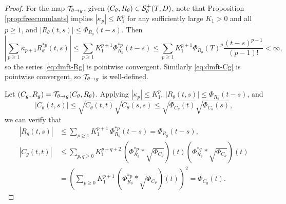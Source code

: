 \begin{proof}
For the map $\mathcal{T}_{\theta\to g}$, given $(C_\theta,R_\theta)\in
\mathcal{S}_\theta^+(T,D)$, note that Proposition \ref{prop:freecumulants}
implies $|\kappa_p| \leq K_1^p$ for any sufficiently large $K_1>0$ and all
$p \geq 1$, and $|R_\theta(t,s)| \leq \Phi_{R_\theta}(t-s)$. Then
\[\left|\sum_{p \geq 1} \kappa_{p+1} R_\theta^{*p}(t,s)\right|
\leq \sum_{p \geq 1} K_1^{p+1} \Phi_{R_\theta}^{*p}(t-s)
\leq \sum_{p \geq 1} K_1^{p+1}\Phi_{R_\theta}(T)^p
\frac{(t-s)^{p-1}}{(p-1)!}<\infty,\]
so the series \eqref{eq:dmft-Rg} is pointwise convergent. Similarly
\eqref{eq:dmft-Cg} is pointwise convergent, so
$\mathcal{T}_{\theta\to g}$ is well-defined.

Let $(C_g,R_g)=\mathcal{T}_{\theta\to g}(C_\theta,R_\theta)$. 
Applying $|\kappa_p| \leq K_1^p$, $|R_\theta(t,s)| \leq \Phi_{R_\theta}(t-s)$,
and
\[
|C_\theta(t,s)| \le \sqrt{C_\theta(t,t)}\sqrt{C_\theta(s,s)} \le \sqrt{\Phi_{C_\theta}(t)}\sqrt{\Phi_{C_\theta}(s)},
\]
we can verify that
\begin{align*}
    |R_g(t,s)| &\le \sum_{p \geq 1} K_1^{p+1}\,\Phi_{R_\theta}^{\ast p}(t-s) =
\Phi_{R_g}(t-s),\\
    |C_g(t,t)| &\le \sum_{p,q \geq 0} K_1^{p+q+2}\,
(\Phi_{R_\theta}^{\ast p} \ast \sqrt{\Phi_{C_\theta}})(t) (\Phi_{R_\theta}^{\ast
q} \ast \sqrt{\Phi_{C_\theta}})(t)\\
&=\left(\sum_{p\ge 0} K_1^{p+1}\,
(\Phi_{R_\theta}^{\ast p} \ast \sqrt{\Phi_{C_\theta}})(t)\right)^2 = \Phi_{C_g}(t).
\end{align*}


\end{proof}
